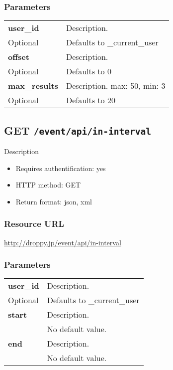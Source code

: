 \documentclass[11pt,a4paper]{article}
\newcommand{\content}[1]{\begin{minipage}{10cm}\vspace{2mm}#1\vspace{2mm}\end{minipage}}
\begin{document}
  \subsubsection*{Parameters}
  \begin{table}[h]
    \begin{center}
      \begin{tabular}{l l}
        \hline 
      \textbf{user\_id} & \content{Description. }
      \\
      Optional & Defaults to \_current\_user\\
      \hline
      \textbf{offset} & \content{Description. }
      \\
      Optional & Defaults to 0\\
      \hline
      \textbf{max\_results} & \content{Description. max: 50, min: 3}
      \\
      Optional & Defaults to 20\\
      \hline
      \end{tabular}
    \end{center}
  \end{table}
  
      \newpage
      
      
  \subsection*{GET {\tt /event/api/in-interval}}
  Description
  \begin{itemize}
  \item Requires authentification: yes
  \item HTTP method: GET
  \item Return format: json, xml
  \end{itemize}
  \subsubsection*{Resource URL}
  \url{http://droppy.jp/event/api/in-interval}
  \subsubsection*{Parameters}
  \begin{table}[h]
    \begin{center}
      \begin{tabular}{l l}
        \hline 
      \textbf{user\_id} & \content{Description. }
      \\
      Optional & Defaults to \_current\_user\\
      \hline
      \textbf{start} & \content{Description. }
      \\
       & No default value.\\
      \hline
      \textbf{end} & \content{Description. }
      \\
       & No default value.\\
      \hline
      \end{tabular}
    \end{center}
  \end{table}
  
\end{document}
